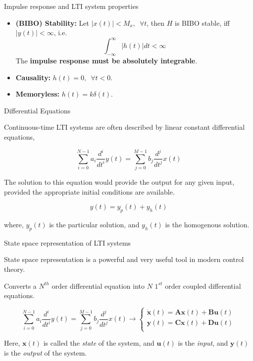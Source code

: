 \documentclass{beamer}
\begin{document}
\begin{frame}{Impulse response and LTI system properties}

\begin{itemize}
\item \textbf{(BIBO) Stability:} Let $\left|x(t)\right| < M_x, \,\,\, \forall t$, then $H$ is BIBO stable, iff $\left|y(t)\right| < \infty$, i.e.
\[ \int_{-\infty}^{\infty}\left|h(t)\right|dt < \infty \]
The \textbf{impulse response must be absolutely integrable}.

\item \textbf{Causality:} $h(t) = 0, \,\,\, \forall t < 0$.

\item \textbf{Memoryless:} $h(t) = k\delta(t)$.
\end{itemize}
\end{frame}

\begin{frame}{Differential Equations}

Continuous-time LTI systems are often described by linear constant differential equations,

\[ \sum_{i=0}^{N-1}a_i\frac{d^i}{dt^i}y(t) = \sum_{j=0}^{M-1}b_j\frac{d^j}{dt^j}x(t) \]

The solution to this equation would provide the output for any given input, provided the appropriate initial conditions are available.

\[ y(t) = y_p(t) + y_h(t) \]

where, $y_p(t)$ is the particular solution, and $y_h(t)$ is the homogenous solution.
\end{frame}

\begin{frame}{State space representation of LTI systems}
 
State space representation is a powerful and very useful tool in modern control theory.
\vspace{2mm}

Converts a $N^{th}$ order differential equation into $N$ $1^{st}$ order coupled differential equations.

\[ \sum_{i=0}^{N-1}a_i\frac{d^i}{dt^i}y(t) = \sum_{j=0}^{M-1}b_j\frac{d^j}{dt^j}x(t) \longrightarrow \begin{cases}
 \dot{\mathbf{x}}(t) = \mathbf{A}\mathbf{x}(t) + \mathbf{B}\mathbf{u}(t)\\
 \mathbf{y}(t) = \mathbf{C}\mathbf{x}(t) + \mathbf{D}\mathbf{u}(t)\\
\end{cases} \]

Here, $\mathbf{x}(t)$ is called the \textit{state} of the system, and $\mathbf{u}(t)$ is the \textit{input}, and $\mathbf{y}(t)$ is the \textit{output} of the system.

\end{frame}
\end{document}

